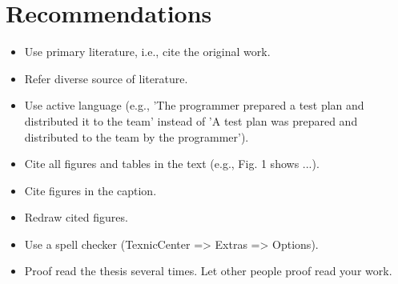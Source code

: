\section{Recommendations}

\begin{itemize}
	\item Use primary literature, i.e., cite the original work.
	\item Refer diverse source of literature.
	\item Use active language (e.g., 'The programmer prepared a test plan and distributed it to the team' instead of 'A test plan was prepared and distributed to the team by the programmer'). 
	\item Cite all figures and tables in the text (e.g., Fig. 1 shows ...).
	\item Cite figures in the caption.
	\item Redraw cited figures.
	\item Use a spell checker (TexnicCenter => Extras => Options).
	\item Proof read the thesis several times. Let other people proof read your work.
	
	
\end{itemize}



 

